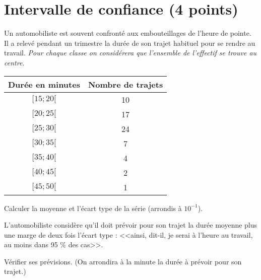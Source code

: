 \section{Intervalle de confiance (4 points)}

Un automobiliste est souvent confronté aux embouteillages de l'heure de pointe. Il a relevé pendant un trimestre la durée de son trajet habituel pour se rendre au travail. \emph{Pour chaque classe on considérera que l'ensemble de l'effectif se trouve au centre.}

\vspace*{0.5cm}

\begin{center}
	\begin{tabular}{|c|c|}
	\hline
	Durée en minutes & Nombre de trajets \\ \hline
	$[15 ; 20[$        & 10                \\ \hline
	$[20 ; 25[$        & 17                \\ \hline
	$[25 ; 30[$        & 24                \\ \hline
	$[30 ; 35[$        & 7                 \\ \hline
	$[35 ; 40[$        & 4                 \\ \hline
	$[40 ; 45[$        & 2                 \\ \hline
	$[45 ; 50[$        & 1                 \\ \hline
\end{tabular}
\end{center}

\begin{questions}
	\question[2] Calculer la moyenne et l'écart type de la série (arrondis à $10^{-1}$).
	
	\question[2] L'automobiliste considère qu'il doit prévoir pour son trajet la durée moyenne plus une marge de deux fois l'écart type : <<ainsi, dit-il, je serai à l'heure au travail, au moins dans 95 \% des cas>>.
	
	Vérifier ses prévisions. (On arrondira à la minute la durée à prévoir pour son trajet.)
\end{questions}